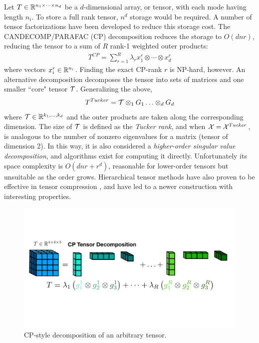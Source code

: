 Let $T \in \mathbb{R}^{n_1 \times \cdots \times n_d}$ be a $d$-dimensional array, or tensor, with each mode having length $n_i$. To store a full rank tensor, $n^d$ storage would be required.
A number of tensor factorizations have been developed to reduce this storage cost.
The CANDECOMP/PARAFAC (CP) decomposition \citep{harshman1970foundations,carroll1970analysis} reduces the storage to $O(dnr)$,
reducing the tensor to a sum of $R$ rank-1 weighted outer products:
\begin{align}
T^{CP} = \sum_{r=1}^R \lambda_r x_1^r \otimes \cdots \otimes x_d^r
\end{align}
where vectors $x_i^r \in \mathbb{R}^{n_i}$. Finding the exact CP-rank $r$ is NP-hard, however.
An alternative decomposition decomposes the tensor into sets of matrices and one smaller ``core" tensor $\mathcal{T}$.
Generalizing the above,
\begin{align}
T^{Tucker} = \mathcal{T} \otimes_1 G_1 \ldots \otimes_d G_d 
\end{align}
where $\mathcal{T} \in \mathbb{R}^{k_1,\ldots,k_d}$ and the outer products are taken along the corresponding dimension.
The size of $\mathcal{T}$ is defined as the \textit{Tucker rank}, and when $\mathcal{X} = \mathcal{X}^{Tucker}$, is analogous to the number of nonzero
eigenvalues for a matrix (tensor of dimension 2).
In this way, it is also considered a \textit{higher-order singular value decomposition},
and algorithms exist for computing it directly.
Unfortunately its space complexity is $O(dnr + r^d)$, reasonable for lower-order tensors
but unsuitable as the order grows.
Hierarchical tensor methods have also proven to be effective in tensor compression \citep{cohen2016expressive, cohen2016convolutional},
and have led to a newer construction with interesting properties.
\begin{figure}
	\centering
	\includegraphics[width=\textwidth,trim={0 9cm 0 10cm},clip]{2_bknd/cpdecomp.pdf}
	\caption[Tensor decompositions]{\label{fig:cp_decomp} CP-style decomposition of an arbitrary tensor.}
\end{figure}

